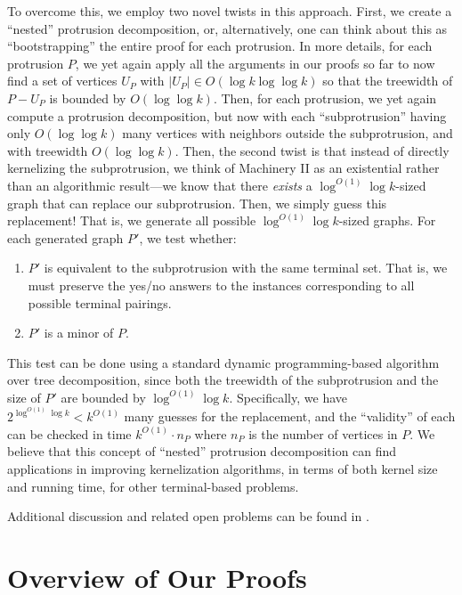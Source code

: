 \documentclass{article}
\numberwithin{claimcounter}{lemma}
\begin{document}
To overcome this, we employ two novel twists in this approach.  First, we create a ``nested'' protrusion decomposition, or, alternatively, one can think about this as ``bootstrapping'' the entire proof for each protrusion. In more details, for each protrusion $P$, we yet again apply all the arguments in our proofs so far to now find a set of vertices $U_P$ with $|U_P|\in O(\log k\log\log k)$ so that the treewidth of $P-U_P$ is bounded by $O(\log\log k)$. Then, for each protrusion, we yet again compute a protrusion decomposition, but now with each ``subprotrusion'' having only $O(\log\log k)$ many vertices with neighbors outside the subprotrusion, and with treewidth $O(\log\log k)$. Then, the second twist is that instead of directly kernelizing the subprotrusion, we think of Machinery II as an existential rather than an algorithmic result---we know that there {\em exists} a $\log^{O(1)}\log k$-sized graph that can replace our subprotrusion. Then, we simply guess this replacement! That is, we generate all possible $\log^{O(1)}\log k$-sized graphs. For each generated graph $P'$, we test whether: 
\begin{enumerate}
\item $P'$ is equivalent to the subprotrusion with the same terminal set. That is, we must preserve the yes/no answers to the instances corresponding to all possible terminal pairings.
\item $P'$ is a minor of $P$.
\end{enumerate}

This test can be done using a standard dynamic programming-based algorithm over tree decomposition, since both the treewidth of the subprotrusion and the size of $P'$ are bounded by $\log^{O(1)}\log k$. Specifically, we have $2^{\log^{O(1)}\log k}<k^{O(1)}$ many guesses for the replacement, and the ``validity'' of each can be checked in time $k^{O(1)}\cdot n_P$ where $n_P$ is the number of vertices in $P$. We believe that this  concept of ``nested'' protrusion decomposition can find applications  in improving  kernelization algorithms, in terms of both  kernel size and running time, for other terminal-based problems.


Additional discussion and related open problems can be found in .



\section{Overview of Our Proofs}\label{sec:overview}
\end{document}
